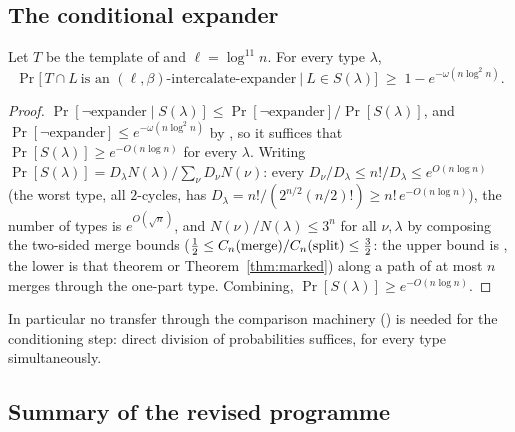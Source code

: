 \subsection{The conditional expander}\label{sec:condexp}

\begin{lemma}\label{lem:condexp}
Let $T$ be the template of \cite[Lem.~8.3]{KPS25} and
$\ell=\log^{11}n$.  For every type $\lambda$,
\[
\Pr\bigl[\,T\cap L\ \text{is an }(\ell,\beta)\text{-intercalate-expander}
\ \big|\ L\in S(\lambda)\bigr]
\;\ge\;1-e^{-\omega(n\log^2 n)}.
\]
\end{lemma}

\begin{proof}
$\Pr[\lnot\text{expander}\mid S(\lambda)]\le
\Pr[\lnot\text{expander}]/\Pr[S(\lambda)]$, and
$\Pr[\lnot\text{expander}]\le e^{-\omega(n\log^2n)}$ by
\cite[Lem.~8.3]{KPS25}, so it suffices that
$\Pr[S(\lambda)]\ge e^{-O(n\log n)}$ for every $\lambda$.  Writing
$\Pr[S(\lambda)]=D_\lambda N(\lambda)/\sum_\nu D_\nu N(\nu)$:
every $D_\nu/D_\lambda\le n!/D_\lambda\le e^{O(n\log n)}$ (the worst
type, all $2$-cycles, has $D_\lambda=n!/(2^{n/2}(n/2)!)\ge
n!\,e^{-O(n\log n)}$), the number of types is $e^{O(\sqrt n)}$, and
$N(\nu)/N(\lambda)\le3^{n}$ for all $\nu,\lambda$ by composing the
two-sided merge bounds ($\frac12\le C_n(\text{merge})/
C_n(\text{split})\le\frac32$: the upper bound is
\cite[Thm.~3.13]{CGW08}, the lower is that theorem or
Theorem~\ref{thm:marked}) along a path of at most $n$ merges through
the one-part type.  Combining, $\Pr[S(\lambda)]\ge
e^{-O(n\log n)}$.
\end{proof}

In particular no transfer through the comparison machinery
(\cite[Lem.~4.7]{KPS25}) is needed for the conditioning step: direct
division of probabilities suffices, for every type simultaneously.

\subsection{Summary of the revised programme}

